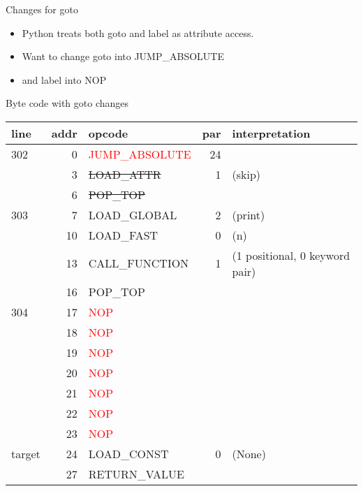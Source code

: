 \documentclass{beamer}
\begin{document}
\begin{frame}{Changes for goto}

\begin{itemize}
\item Python treats both goto and label as attribute access.

\item Want to change goto into JUMP\_ABSOLUTE

\item and label into NOP
\end{itemize}
\end{frame}

\begin{frame}[fragile]{Byte code with goto changes}
\begin{tabular}{l|r|l|r|l}
line & addr & opcode & par & interpretation \\
\hline
302 &          0 & \textcolor{red}{JUMP\_ABSOLUTE}         &     24 &  \\
     &           3 &  \sout{LOAD\_ATTR}               &   1  & (skip)  \\
      &          6 &  \sout{POP\_TOP}      &  &           \\
\hline
303   &          7 &  LOAD\_GLOBAL         &       2  & (print)  \\
          &     10 &  LOAD\_FAST           &       0 &  (n)  \\
              & 13 &  CALL\_FUNCTION        &      1  & (1 positional, 0 keyword pair)  \\
     &          16 &  POP\_TOP            &     &  \\
\hline
304   &         17 &  \textcolor{red}{NOP}        &          &   \\
      &         18 &  \textcolor{red}{NOP}        &          &   \\
      &         19 &  \textcolor{red}{NOP}        &          &   \\
      &         20 &  \textcolor{red}{NOP}        &          &   \\
      &         21 &  \textcolor{red}{NOP}        &          &   \\
      &         22 &  \textcolor{red}{NOP}        &          &   \\
      &         23 &  \textcolor{red}{NOP}        &          &   \\
\hline
target     &          24 &  LOAD\_CONST         &        0  & (None)  \\
     &          27 &  RETURN\_VALUE      &      &  \\
\end{tabular}
\end{frame}
\end{document}
